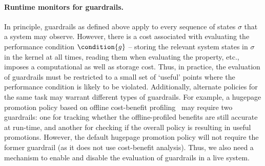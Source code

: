 \paragraph{Runtime monitors for guardrails.}
In principle, guardrails as defined above apply to every sequence of states $\sigma$ that a system may observe.
However, there is a cost associated with evaluating the performance condition $\condition{g}$ -- storing the relevant system states in $\sigma$ in the kernel at all times, reading them when evaluating the property, etc., imposes a computational as well as storage cost. 
Thus, in practice, the evaluation of guardrails must be restricted to a small set of `useful' points where the performance condition is likely to be violated.
Additionally, alternate policies for the same task may warrant different types of guardrails.
For example, a hugepage promotion policy based on offline cost-benefit profiling~\cite{cbmm-atc22} may require two guardrails: one for tracking whether the offline-profiled benefits are still accurate at run-time, and another for checking if the overall policy is resulting in useful promotions.
However, the default hugepage promotion policy will not require the former guardrail (as it does not use cost-benefit analysis).
Thus, we also need a mechanism to enable and disable the evaluation of guardrails in a live system.

